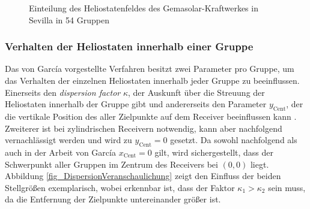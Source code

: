 \begin{figure}[h!]
    \centering
    \setlength{\fboxsep}{1pt}
    \setlength{\fboxrule}{1pt}
    \caption[Einteilung des Heliostatenfeldes des Gemasolar-Kraftwerkes in Sevilla in 54 Gruppen]{Einteilung des Heliostatenfeldes des Gemasolar-Kraftwerkes in Sevilla in 54 Gruppen \cite[S.10]{Garcia2}}
    \label{fig_VerteilungHeliostateGarcia}
\end{figure}

\subsubsection*{Verhalten der Heliostaten innerhalb einer Gruppe} \label{subsubsec_Gruppenverhalten}
Das von García vorgestellte Verfahren besitzt zwei Parameter pro Gruppe, um das Verhalten der einzelnen Heliostaten innerhalb jeder Gruppe zu beeinflussen.
Einerseits den \textit{dispersion factor} $\kappa$, der Auskunft über die Streuung der Heliostaten innerhalb der Gruppe gibt und andererseits den Parameter $y_{\mathrm{Cent}}$, der die vertikale Position des  aller Zielpunkte auf dem Receiver beeinflussen kann \cite[S.5]{Garcia2}.
Zweiterer ist bei zylindrischen Receivern notwendig, kann aber nachfolgend vernachlässigt werden und wird zu $y_{\mathrm{Cent}} = 0$ gesetzt.
Da sowohl nachfolgend als auch in der Arbeit von García $x_{\mathrm{Cent}} = 0$ gilt, wird sichergestellt, dass der Schwerpunkt aller Gruppen im Zentrum des Receivers bei $(0,0)$ liegt.
Abbildung \ref{fig_DispersionVeranschaulichung} zeigt den Einfluss der beiden Stellgrößen exemplarisch, wobei erkennbar ist, dass der Faktor $\kappa_1 > \kappa_2$ sein muss, da die Entfernung der Zielpunkte untereinander größer ist.

